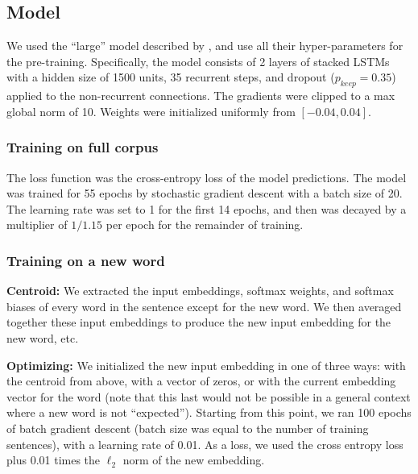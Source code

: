 \documentclass{article}
\begin{document}
\subsection{Model} \label{methods_appdx_model}
We used the ``large'' model described by \citet{Zaremba2014a}, and use all their hyper-parameters for the pre-training. Specifically, the model consists of 2 layers of stacked LSTMs with a hidden size of 1500 units, 35 recurrent steps, and dropout (\(p_{keep} = 0.35\)) applied to the non-recurrent connections. The gradients were clipped to a max global norm of 10. Weights were initialized uniformly from \([-0.04, 0.04]\). \par
\subsubsection{Training on full corpus}
The loss function was the cross-entropy loss of the model predictions. The model was trained for 55 epochs by stochastic gradient descent with a batch size of 20. The learning rate was set to 1 for the first 14 epochs, and then was decayed by a multiplier of \(1 / 1.15\) per epoch for the remainder of training. \par 
\subsubsection{Training on a new word} 
\textbf{Centroid:} We extracted the input embeddings, softmax weights, and softmax biases of every word in the sentence except for the new word. We then averaged together these input embeddings to produce the new input embedding for the new word, etc. \par
\textbf{Optimizing:} We initialized the new input embedding in one of three ways: with the centroid from above, with a vector of zeros, or with the current embedding vector for the word (note that this last would not be possible in a general context where a new word is not ``expected''). Starting from this point, we ran 100 epochs of batch gradient descent (batch size was equal to the number of training sentences), with a learning rate of 0.01. As a loss, we used the cross entropy loss plus 0.01 times the \(\ell_2\) norm of the new embedding.\par 
\end{document}
